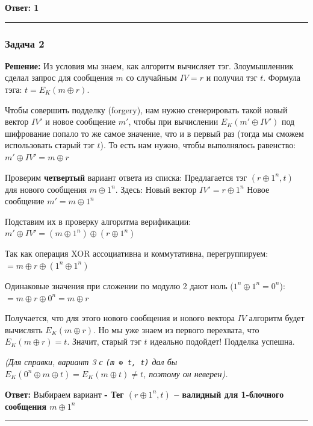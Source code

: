 \textbf{Ответ: 1}

\begin{center}\rule{0.5\linewidth}{0.5pt}\end{center}

\subsubsection{Задача 2}\label{ux437ux430ux434ux430ux447ux430-2}

\textbf{Решение:} Из условия мы знаем, как алгоритм вычисляет тэг. Злоумышленник сделал запрос для сообщения \(m\) со случайным \(IV = r\) и получил тэг \(t\). Формула тэга: \(t = E_K(m \oplus r)\).

Чтобы совершить подделку (forgery), нам нужно сгенерировать такой новый вектор \(IV'\) и новое сообщение \(m'\), чтобы при вычислении \(E_K(m' \oplus IV')\) под шифрование попало то же самое значение, что и в первый раз (тогда мы сможем использовать старый тэг \(t\)). То есть нам нужно, чтобы выполнялось равенство: \(m' \oplus IV' = m \oplus r\)

Проверим \textbf{четвертый} вариант ответа из списка: Предлагается тэг \textbf{\((r \oplus 1^n, t)\)} для нового сообщения \textbf{\(m \oplus 1^n\)}. Здесь: Новый вектор \(IV' = r \oplus 1^n\) Новое сообщение \(m' = m \oplus 1^n\)

Подставим их в проверку алгоритма верификации: \(m' \oplus IV' = (m \oplus 1^n) \oplus (r \oplus 1^n)\)

Так как операция XOR ассоциативна и коммутативна, перегруппируем: \(= m \oplus r \oplus (1^n \oplus 1^n)\)

Одинаковые значения при сложении по модулю 2 дают ноль (\(1^n \oplus 1^n = 0^n\)): \(= m \oplus r \oplus 0^n = m \oplus r\)

Получается, что для этого нового сообщения и нового вектора \(IV\) алгоритм будет вычислять \(E_K(m \oplus r)\). Но мы уже знаем из первого перехвата, что \(E_K(m \oplus r) = t\). Значит, старый тэг \(t\) идеально подойдет! Подделка успешна.

\emph{(Для справки, вариант 3 с \texttt{(m\ ⊕\ t,\ t)} дал бы \(E_K(0^n \oplus m \oplus t) = E_K(m \oplus t) \neq t\), поэтому он неверен).}

\textbf{Ответ:} Выбираем вариант \textbf{- Тег \((r \oplus 1^n, t)\) -- валидный для 1-блочного сообщения \(m \oplus 1^n\)}

\begin{center}\rule{0.5\linewidth}{0.5pt}\end{center}

